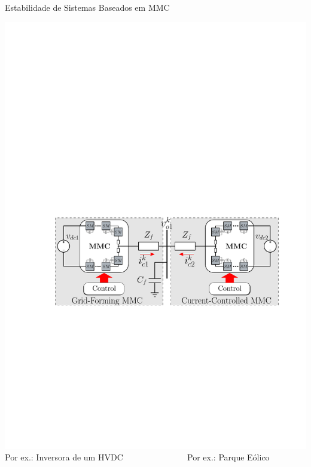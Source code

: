 


\begin{frame}{Estabilidade de Sistemas Baseados em MMC}

\centering
\includegraphics[width=0.9\linewidth]{./figuras/aplicacao/conjunto_MMC5}\\


Por ex.: Inversora de um HVDC
~~~~~~~~~~~~~~
Por ex.: Parque Eólico

\end{frame}



